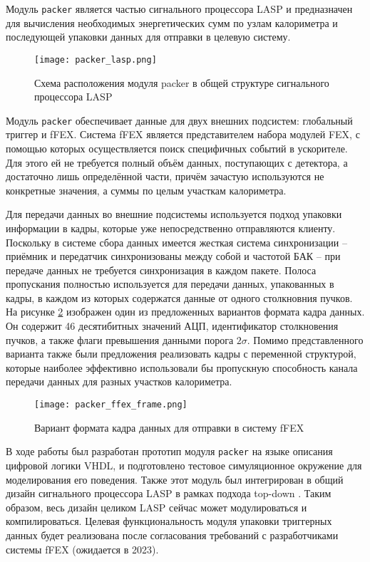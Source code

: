 Модуль \texttt{packer} является частью сигнального процессора LASP и предназначен для вычисления необходимых энергетических сумм по узлам калориметра и последующей упаковки данных для отправки в целевую систему.\par
\begin{figure}[ht]
    \centering
    \texttt{[image: packer\_lasp.png]}
    \caption{Схема расположения модуля packer в общей структуре сигнального процессора LASP}
    \label{fig:packer_lasp}
\end{figure}\par

Модуль \texttt{packer} обеспечивает данные для двух внешних подсистем: глобальный триггер и fFEX. Система fFEX \parencite{tdr_blue} является представителем набора модулей FEX, с помощью которых осуществляется поиск специфичных событий в ускорителе. Для этого ей не требуется полный объём данных, поступающих с детектора, а достаточно лишь определённой части, причём зачастую используются не конкретные значения, а суммы по целым участкам калориметра.\par
Для передачи данных во внешние подсистемы используется подход упаковки информации в кадры, которые уже непосредственно отправляются клиенту. Поскольку в системе сбора данных имеется жесткая система синхронизации -- приёмник и передатчик синхронизованы между собой и частотой БАК -- при передаче данных не требуется синхронизация в каждом пакете. Полоса пропускания полностью используется для передачи данных, упакованных в кадры, в каждом из которых содержатся данные от одного столкновния пучков. На рисунке \ref{fig:packer_ffex_frame} изображен один из предложенных вариантов формата кадра данных. Он содержит 46 десятибитных значений АЦП, идентификатор столкновения пучков, а также флаги превышения данными порога $2 \sigma$. Помимо представленного варианта также были предложения реализовать кадры с переменной структурой, которые наиболее эффективно использовали бы пропускную способность канала передачи данных для разных участков калориметра.\par
\begin{figure}[ht]
    \centering
    \texttt{[image: packer\_ffex\_frame.png]}
    \caption{Вариант формата кадра данных для отправки в систему fFEX}
    \label{fig:packer_ffex_frame}
\end{figure}\par
В ходе работы был разработан прототип модуля \texttt{packer} на языке описания цифровой логики VHDL, и подготовлено тестовое симуляционное окружение для моделирования его поведения. Также этот модуль был интегрирован в общий дизайн сигнального процессора LASP в рамках подхода top-down \parencite{topdown}. Таким образом, весь дизайн целиком LASP сейчас может модулироваться и компилироваться. Целевая функциональность модуля упаковки триггерных данных будет реализована после согласования требований с разработчиками системы fFEX (ожидается в 2023).\par
